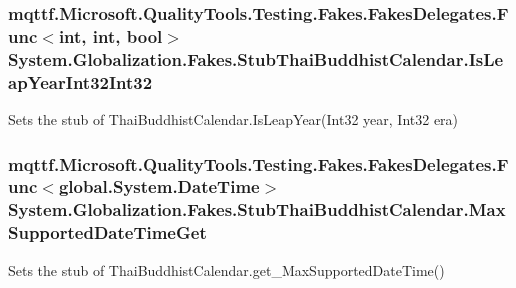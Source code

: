 \hypertarget{class_system_1_1_globalization_1_1_fakes_1_1_stub_thai_buddhist_calendar_a8163150d0e0e464392534b8aacd0bad1}{
\subsubsection[{Is\-Leap\-Year\-Int32\-Int32}]{\setlength{\rightskip}{0pt plus 5cm}mqttf.\-Microsoft.\-Quality\-Tools.\-Testing.\-Fakes.\-Fakes\-Delegates.\-Func$<$int, int, bool$>$ System.\-Globalization.\-Fakes.\-Stub\-Thai\-Buddhist\-Calendar.\-Is\-Leap\-Year\-Int32\-Int32}}\label{class_system_1_1_globalization_1_1_fakes_1_1_stub_thai_buddhist_calendar_a8163150d0e0e464392534b8aacd0bad1}


Sets the stub of Thai\-Buddhist\-Calendar.\-Is\-Leap\-Year(\-Int32 year, Int32 era)

\hypertarget{class_system_1_1_globalization_1_1_fakes_1_1_stub_thai_buddhist_calendar_af7cc8eac819bd19688541596814efbc3}{
\subsubsection[{Max\-Supported\-Date\-Time\-Get}]{\setlength{\rightskip}{0pt plus 5cm}mqttf.\-Microsoft.\-Quality\-Tools.\-Testing.\-Fakes.\-Fakes\-Delegates.\-Func$<$global.\-System.\-Date\-Time$>$ System.\-Globalization.\-Fakes.\-Stub\-Thai\-Buddhist\-Calendar.\-Max\-Supported\-Date\-Time\-Get}}\label{class_system_1_1_globalization_1_1_fakes_1_1_stub_thai_buddhist_calendar_af7cc8eac819bd19688541596814efbc3}


Sets the stub of Thai\-Buddhist\-Calendar.\-get\-\_\-\-Max\-Supported\-Date\-Time()

